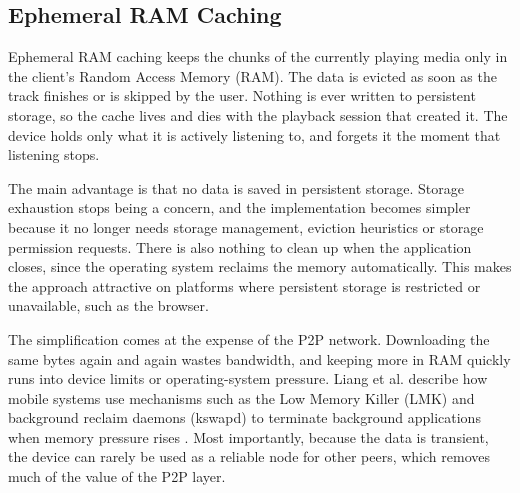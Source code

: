 \subsection{Ephemeral RAM Caching}
\indent \par Ephemeral RAM caching keeps the chunks of the currently playing media only in the client's Random Access Memory (RAM). The data is evicted as soon as the track finishes or is skipped by the user. Nothing is ever written to persistent storage, so the cache lives and dies with the playback session that created it. The device holds only what it is actively listening to, and forgets it the moment that listening stops.

\par The main advantage is that no data is saved in persistent storage. Storage exhaustion stops being a concern, and the implementation becomes simpler because it no longer needs storage management, eviction heuristics or storage permission requests. There is also nothing to clean up when the application closes, since the operating system reclaims the memory automatically. This makes the approach attractive on platforms where persistent storage is restricted or unavailable, such as the browser.

\par The simplification comes at the expense of the P2P network. Downloading the same bytes again and again wastes bandwidth, and keeping more in RAM quickly runs into device limits or operating-system pressure. Liang et al. describe how mobile systems use mechanisms such as the Low Memory Killer (LMK) and background reclaim daemons (kswapd) to terminate background applications when memory pressure rises \cite{apps_performance_diffs}. Most importantly, because the data is transient, the device can rarely be used as a reliable node for other peers, which removes much of the value of the P2P layer.

